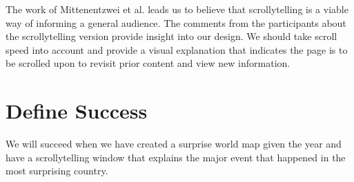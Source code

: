 \documentclass{proc}
\begin{document}
The work of Mittenentzwei et al. \cite{mittenentzwei2023investigating} leads us to believe that scrollytelling is a viable way of informing a general audience. The comments from the participants about the scrollytelling version provide insight into our design. We should take scroll speed into account and provide a visual explanation that indicates the page is to be scrolled upon to revisit prior content and view new information.


\section{Define Success}

We will succeed when we have created a surprise world map given the year and have a scrollytelling window that explains the major event that happened in the most surprising country.



\end{document}
